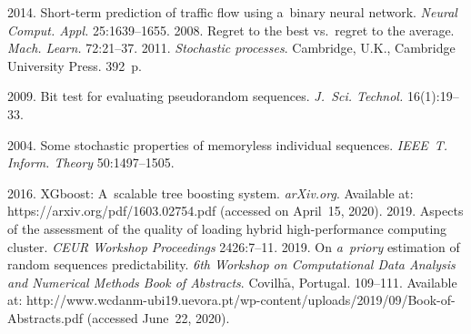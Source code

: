\begin{multicols}{2}
{{\begin{thebibliography}{99}
 2014. Short-term 
prediction of traffic flow using a~binary neural network. \textit{Neural Comput.
 Appl.}  25:1639--1655.
 2008. Regret to the best vs.\ 
regret to the average. \textit{Mach. Learn.}  72:21--37.
 2011. \textit{Stochastic processes}. Cambridge, U.K., Cambridge University 
Press. 392~p.

 2009. Bit test for evaluating pseudorandom sequences. 
\textit{J.~Sci. Technol.} 16(1):19--33.

 2004. Some stochastic properties of memoryless individual sequences. 
\textit{IEEE~T. Inform. Theory} 50:1497--1505.

 2016. XGboost: A~scalable tree boosting system. 
\textit{arXiv.org}. Available at: {\sf https://arxiv.org/pdf/1603.02754.pdf } (accessed on 
April~15, 2020).
 2019. Aspects of the 
assessment of the quality of loading hybrid high-performance computing cluster. \textit{CEUR 
Workshop Proceedings} 2426:7--11.
 2019. On \textit{a~priory} estimation of random sequences 
predictability. \textit{6th 
Workshop on Computational Data Analysis and Numerical Methods Book of Abstracts}.
Covilh$\tilde{\mbox{a}}$, Portugal. 
 109--111.
 Available at: {\sf  
 http://www.wcdanm-ubi19.uevora.pt/wp-content/uploads/2019/09/Book-of-Abstracts.pdf}
 (accessed June~22, 2020).

\end{thebibliography}

 }
 }

\end{multicols}

\vspace*{-6pt}

